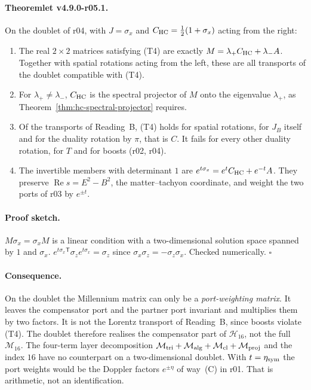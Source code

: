 \paragraph{Theoremlet v4.9.0-r05.1.}
On the doublet of r04, with \(J=\sigma_x\) and \(C_{\mathrm{HC}}=\tfrac12(1+\sigma_x)\) acting from the right:
\begin{enumerate}[leftmargin=2em]
\item[(a)] The real \(2\times2\) matrices satisfying (T4) are exactly \(M=\lambda_+C_{\mathrm{HC}}+\lambda_-A\).  Together with
spatial rotations acting from the left, these are all transports of the doublet compatible with (T4).
\item[(b)] For \(\lambda_+\neq\lambda_-\), \(C_{\mathrm{HC}}\) is the spectral projector of \(M\) onto the eigenvalue \(\lambda_+\),
as Theorem~\ref{thm:hc-spectral-projector} requires.
\item[(c)] Of the transports of Reading~B, (T4) holds for spatial rotations, for \(J_B\) itself and for the duality
rotation by \(\pi\), that is \(C\).  It fails for every other duality rotation, for \(T\) and for boosts (r02, r04).
\item[(d)] The invertible members with determinant \(1\) are \(e^{t\sigma_x}=e^{t}C_{\mathrm{HC}}+e^{-t}A\).  They preserve
\(\operatorname{Re}s=E^2-B^2\), the matter--tachyon coordinate, and weight the two ports of r03 by \(e^{\pm t}\).
\end{enumerate}

\paragraph{Proof sketch.}
\(M\sigma_x=\sigma_xM\) is a linear condition with a two-dimensional solution space spanned by \(1\) and \(\sigma_x\).
\(e^{t\sigma_x}{}^{\mathsf T}\sigma_ze^{t\sigma_x}=\sigma_z\) since \(\sigma_x\sigma_z=-\sigma_z\sigma_x\).  Checked
numerically.  \(\square\)

\paragraph{Consequence.}
On the doublet the Millennium matrix can only be a \emph{port-weighting matrix}.  It leaves the compensator port and the
partner port invariant and multiplies them by two factors.  It is not the Lorentz transport of Reading~B, since boosts
violate (T4).  The doublet therefore realises the compensator part of \(\mathcal H_{16}\), not the full \(\mathcal M_{16}\).
The four-term layer decomposition \(\mathcal M_{\rm tri}+\mathcal M_{\rm alg}+\mathcal M_{\rm cl}+\mathcal M_{\rm proj}\)
and the index \(16\) have no counterpart on a two-dimensional doublet.  With \(t=\eta_{\rm sym}\) the port weights would be
the Doppler factors \(e^{\pm\eta}\) of way~(C) in r01.  That is arithmetic, not an identification.

